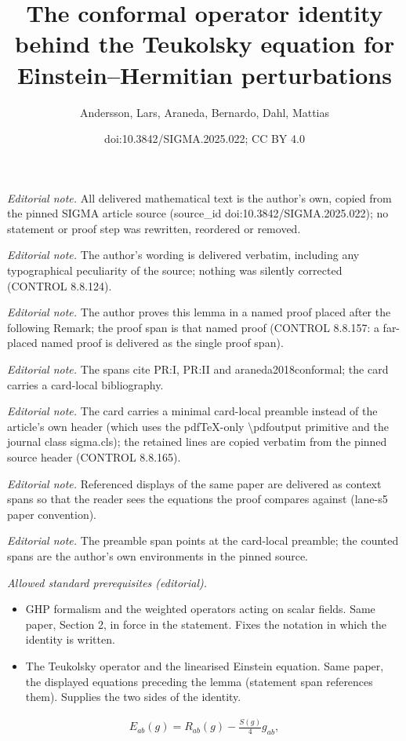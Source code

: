 \documentclass[10pt,a4paper]{amsart}
\title{The conformal operator identity behind the Teukolsky equation for Einstein--Hermitian perturbations}
\author{Andersson, Lars, Araneda, Bernardo, Dahl, Mattias}
\date{doi:10.3842/SIGMA.2025.022; CC BY 4.0}
\numberwithin{equation}{section}
\begin{document}
\maketitle
\setcounter{section}{2}
\setcounter{subsection}{1}
\setcounter{Theorem}{0}
\setcounter{equation}{0}
\noindent\textit{Editorial note.} All delivered mathematical text is the author's own, copied from the pinned SIGMA article source (source\_id doi:10.3842/SIGMA.2025.022); no statement or proof step was rewritten, reordered or removed.\par\medskip
\noindent\textit{Editorial note.} The author's wording is delivered verbatim, including any typographical peculiarity of the source; nothing was silently corrected (CONTROL 8.8.124).\par\medskip
\noindent\textit{Editorial note.} The author proves this lemma in a named proof placed after the following Remark; the proof span is that named proof (CONTROL 8.8.157: a far-placed named proof is delivered as the single proof span).\par\medskip
\noindent\textit{Editorial note.} The spans cite PR:I, PR:II and araneda2018conformal; the card carries a card-local bibliography.\par\medskip
\noindent\textit{Editorial note.} The card carries a minimal card-local preamble instead of the article's own header (which uses the pdfTeX-only \textbackslash{}pdfoutput primitive and the journal class sigma.cls); the retained lines are copied verbatim from the pinned source header (CONTROL 8.8.165).\par\medskip
\noindent\textit{Editorial note.} Referenced displays of the same paper are delivered as context spans so that the reader sees the equations the proof compares against (lane-s5 paper convention).\par\medskip
\noindent\textit{Editorial note.} The preamble span points at the card-local preamble; the counted spans are the author's own environments in the pinned source.\par\medskip
\noindent\textit{Allowed standard prerequisites (editorial).}\begin{itemize}
\item GHP formalism and the weighted operators acting on scalar fields. Same paper, Section 2, in force in the statement. Fixes the notation in which the identity is written.
\item The Teukolsky operator and the linearised Einstein equation. Same paper, the displayed equations preceding the lemma (statement span references them). Supplies the two sides of the identity.
\end{itemize}\medskip
\begin{align}\label{eq:EinsteinOp}
E_{ab}(g) = R_{ab}(g) - \frac{S(g)}{4}g_{ab},
\end{align}
\end{document}
